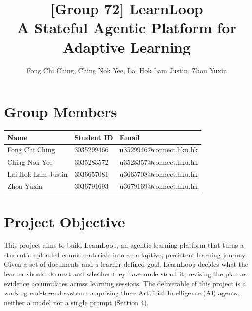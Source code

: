 \documentclass{article}
\title{[Group 72] LearnLoop\\A Stateful Agentic Platform for Adaptive Learning}
\author{Fong Chi Ching, Ching Nok Yee, Lai Hok Lam Justin, Zhou Yuxin}
\begin{document}
\maketitle




\section{Group Members}

\begin{tabular}{@{}lll@{}}

\toprule

\textbf{Name} & \textbf{Student ID} & \textbf{Email} \\

\midrule

Fong Chi Ching & 3035299466 & u3529946@connect.hku.hk \\

Ching Nok Yee & 3035283572 & u3528357@connect.hku.hk \\

Lai Hok Lam Justin & 3036657081 & u3665708@connect.hku.hk \\

Zhou Yuxin & 3036791693 & u3679169@connect.hku.hk \\

\bottomrule

\end{tabular}

\section{Project Objective}

This project aims to build LearnLoop, an agentic learning platform that turns a student's uploaded course materials into an adaptive, persistent learning journey. Given a set of documents and a learner-defined goal, LearnLoop decides what the learner should do next and whether they have understood it, revising the plan as evidence accumulates across learning sessions. The deliverable of this project is a working end-to-end system comprising three Artificial Intelligence (AI) agents, neither a model nor a single prompt (Section 4).
\end{document}
